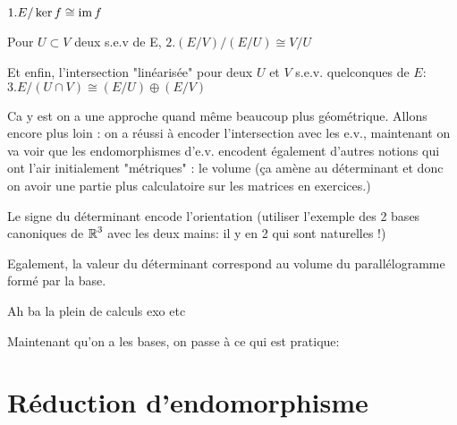 \begin{theorem}
	$1. E/\ker f \cong \operatorname{im} f$

	Pour $U\subset V$ deux s.e.v de E,
	$2. \left(E/V\right) / \left(E/U\right) \cong V/U$

	Et enfin, l'intersection "linéarisée" pour deux $U$ et $V$ s.e.v. quelconques de $E$:
	$3. E / \left(U \cap V\right) \cong \left(E/U\right)\oplus\left(E/V\right)$
\end{theorem}

\begin{remark}
	Ca y est on a une approche quand même beaucoup plus géométrique.
	Allons encore plus loin : on a réussi à encoder l'intersection avec les e.v.,
	maintenant on va voir que les endomorphismes d'e.v. encodent également d'autres
	notions qui ont l'air initialement "métriques" : le volume (ça amène au déterminant et 
	donc on avoir une partie plus calculatoire sur les matrices en exercices.)
\end{remark}

\begin{definition}
\end{definition}

\begin{remark}
	Le signe du déterminant encode l'orientation (utiliser l'exemple
	des 2 bases canoniques de $\operatorname{\mathbb{R}}^3$ avec les deux mains: il y en 2 qui sont naturelles !)

	Egalement, la valeur du déterminant correspond au volume du parallélogramme formé par la base.
\end{remark}

\begin{example}
	Ah ba la plein de calculs exo etc
\end{example}

Maintenant qu'on a les bases, on passe à ce qui est pratique:
\section{Réduction d'endomorphisme}

\begin{definition}
\end{definition}

\begin{definition}
\end{definition}


